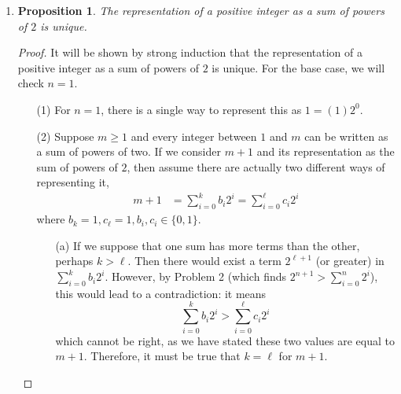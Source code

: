 \documentclass{homework}
\newtheorem*{prop}{Proposition}
\begin{document}
\begin{enumerate}
\begin{minipage}[t]{\linewidth}
\begin{proof}
\begin{enumerate}
					\underline{Case 2: $m+1$ is odd}. If $m+1$ is odd, then $m$ must be even. This means that in the sum representing $m$, the last coefficient $b_0 = 0$. Then $m+1$ is the same sum but now with $b_0 = 1$, 
					\begin{align*}
						m & = b_0 2^0 + b_1 2^1 + \dots \\
						  & = 0 \times 2^0 + b_1 2^1 + \dots \\	
						 m+1 & = 1 \times 2^0 + b_1 2^1 + \dots
					\end{align*}
					Therefore $m+1$ can be written as the sum of powers of two.
				\end{enumerate}
			\end{proof}
		\end{minipage}
	
		\item \begin{minipage}[t]{\linewidth}
			\begin{prop}
				The representation of a positive integer as a sum of powers of $2$ is unique.
			\end{prop}
			\begin{proof} It will be shown by strong induction that the representation of a positive integer as a sum of powers of $2$ is unique. For the base case, we will check $n=1$.
				\begin{enumerate}
					\item[(1)] For $n=1$, there is a single way to represent this as $1 = (1)2^0$.
					\item[(2)] Suppose $m \ge 1$ and every integer between $1$ and $m$ can be written as a sum of powers of two. If we consider $m+1$ and its representation as the sum of powers of $2$, then assume there are actually two different ways of representing it, \begin{align*}
						m+1 & = \sum_{i = 0}^k b_i 2^i = \sum_{i = 0}^\ell c_i 2^i
					\end{align*}
					where $b_k = 1, c_\ell = 1, b_i, c_i \in \{0, 1\}$.
					
					\begin{enumerate}
						\item[(a)] If we suppose that one sum has more terms than the other, perhaps $k > \ell$. Then there would exist a term $2^{\ell + 1}$ (or greater) in $\sum_{i=0}^k b_i 2^i$. However, by Problem 2 (which finds $2^{n+1} > \sum_{i=0}^n 2^i$), this would lead to a contradiction: it means $$ \sum_{i = 0}^k b_i 2^i > \sum_{i = 0}^\ell c_i 2^i$$
						which cannot be right, as we have stated these two values are equal to $m+1$. Therefore, it must be true that $k=\ell$ for $m+1$.
						

\end{enumerate}
\end{enumerate}
\end{proof}
\end{minipage}
\end{enumerate}
\end{document}
